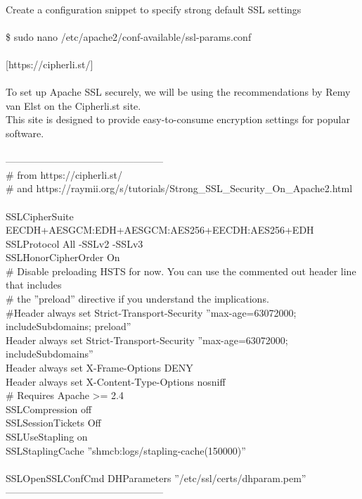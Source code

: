 \documentclass[10pt,a4paper]{article}
\begin{document}
{{{{{{{{{{{{{{{{{{\\
Create a configuration snippet to specify strong default SSL settings\\
\\
\$ sudo nano /etc/apache2/conf-available/ssl-params.conf}{\large \\
\\
[https://cipherli.st/}{\large ]\\
\\
To set up Apache SSL securely, we will be using the recommendations by Remy van Elst on the Cipherli.st site. \\
This site is designed to provide easy-to-consume encryption settings for popular software.\\
\\
------------------------------------------------\\
\# from https://cipherli.st/}{\large \\
\# and https://raymii.org/s/tutorials/Strong\_SSL\_Security\_On\_Apache2.html}{\large \\
\\
SSLCipherSuite EECDH+AESGCM:EDH+AESGCM:AES256+EECDH:AES256+EDH\\
SSLProtocol All -SSLv2 -SSLv3\\
SSLHonorCipherOrder On\\
\# Disable preloading HSTS for now.  You can use the commented out header line that includes\\
\# the ''preload'' directive if you understand the implications.\\
\#Header always set Strict-Transport-Security ''max-age=63072000; includeSubdomains; preload''\\
Header always set Strict-Transport-Security ''max-age=63072000; includeSubdomains''\\
Header always set X-Frame-Options DENY\\
Header always set X-Content-Type-Options nosniff\\
\# Requires Apache >= 2.4\\
SSLCompression off \\
SSLSessionTickets Off\\
SSLUseStapling on \\
SSLStaplingCache ''shmcb:logs/stapling-cache(150000)''\\
\\
SSLOpenSSLConfCmd DHParameters ''/etc/ssl/certs/dhparam.pem''\\
------------------------------------------------\\
}}}}}}}}}}}}}}}}}}
\end{document}
